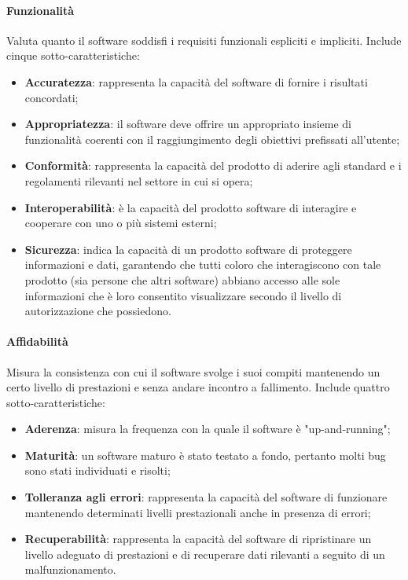 \documentclass[10pt]{article}
\begin{document}
\begin{justify}
            \paragraph{Funzionalità}
            Valuta quanto il software soddisfi i requisiti funzionali espliciti e impliciti. Include cinque sotto-caratteristiche:
            \begin{itemize}
                \item \textbf{Accuratezza}: rappresenta la capacità del software di fornire i risultati concordati;
                \item \textbf{Appropriatezza}: il software deve offrire un appropriato insieme di funzionalità coerenti con il raggiungimento degli obiettivi prefissati all'utente;
                \item \textbf{Conformità}: rappresenta la capacità del prodotto di aderire agli standard e i regolamenti rilevanti nel settore in cui si opera;
                \item \textbf{Interoperabilità}: è la capacità del prodotto software di interagire e cooperare con uno o più sistemi esterni;
                \item \textbf{Sicurezza}: indica la capacità di un prodotto software di proteggere informazioni e dati, garantendo che tutti coloro che interagiscono con tale prodotto (sia persone che altri software) abbiano accesso alle sole informazioni che è loro consentito visualizzare secondo il livello di autorizzazione che possiedono.
            \end{itemize}

            \paragraph{Affidabilità}
            Misura la consistenza con cui il software svolge i suoi compiti mantenendo un certo livello di prestazioni e senza andare incontro a fallimento. Include quattro sotto-caratteristiche:
            \begin{itemize}
                \item \textbf{Aderenza}: misura la frequenza con la quale il software è "up-and-running";
                \item \textbf{Maturità}: un software maturo è stato testato a fondo, pertanto molti bug sono stati individuati e risolti;
                \item \textbf{Tolleranza agli errori}: rappresenta la capacità del software di funzionare mantenendo determinati livelli prestazionali anche in presenza di errori;
                \item \textbf{Recuperabilità}: rappresenta la capacità del software di ripristinare un livello adeguato di prestazioni e di recuperare dati rilevanti a seguito di un malfunzionamento.
            \end{itemize}


\end{justify}
\end{document}
